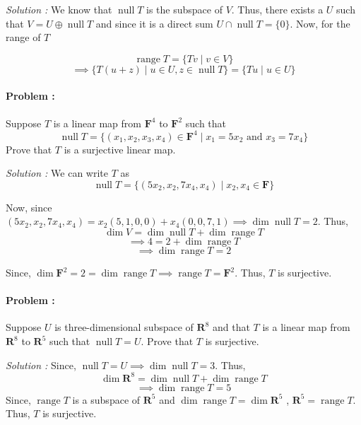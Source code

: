 \vspace{4mm}
\textit{Solution :} We know that $\operatorname{null} T$ is the subspace of $V$. Thus, there exists a $U$ such that 
$V=U \oplus \operatorname{null} T$ and since it is a direct sum $U \cap \operatorname{null} T = \{0\}$. Now, for the range of $T$

\[ \operatorname{range} T = \{ Tv \mid v \in V \} \] 
\[ \implies \{ T(u+z) \mid u \in U , z \in \operatorname{null} T\} = \{Tu \mid u \in U\} \]

\eject

\paragraph{Problem :} Suppose $T$ is a linear map from $\mathbf{F}^4$ to $\mathbf{F}^2$ such that 
\[ \operatorname{null} T = \{ (x_1, x_2, x_3, x_4) \in \mathbf{F}^4 \mid x_1 = 5x_2 \text{ and } x_3 = 7x_4 \} \]
Prove that $T$ is a surjective linear map.

\vspace{4mm}
\textit{Solution :} We can write $T$ as
\[ \operatorname{null} T = \{ (5x_2, x_2, 7x_4, x_4) \mid x_2 , x_4 \in \mathbf{F}  \} \]

Now, since $(5x_2, x_2, 7x_4, x_4)= x_2(5,1,0,0) + x_4(0,0,7,1) \implies \dim \operatorname{null} T = 2 $. Thus,
\[ \dim V = \dim \operatorname{null} T + \dim \operatorname{range} T \] 
\[ \implies 4 = 2 + \dim \operatorname{range} T  \]
\[ \implies \dim \operatorname{range} T = 2 \]

Since, $\dim \mathbf{F}^2 = 2 = \dim \operatorname{range} T \implies \operatorname{range} T = \mathbf{F}^2$. Thus, $T$ is surjective.


\paragraph{Problem :} Suppose $U$ is three-dimensional subspace of $\mathbf{R}^8$ and that $T$ is a linear map from $\mathbf{R}^8$ to 
$\mathbf{R}^5$ such that $\operatorname{null} T = U$. Prove that $T$ is surjective.

\vspace{4mm}
\textit{Solution :} Since, $\operatorname{null} T = U \implies \dim \operatorname{null} T = 3 $. Thus,
\[ \dim \mathbf{R}^8 = \dim \operatorname{null} T + \dim \operatorname{range} T  \]
\[ \implies \dim \operatorname{range} T = 5 \]
Since, $\operatorname{range} T $ is a subspace of $\mathbf{R}^5$ and $\dim \operatorname{range} T = \dim \mathbf{R}^5$ ,
$\mathbf{R}^5 = \operatorname{range} T$. Thus, $T$ is surjective.

